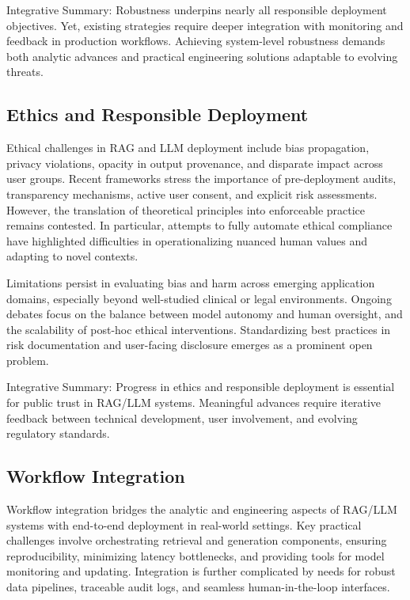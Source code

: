 \documentclass[sigconf]{acmart}
\begin{document}
Integrative Summary: Robustness underpins nearly all responsible deployment objectives. Yet, existing strategies require deeper integration with monitoring and feedback in production workflows. Achieving system-level robustness demands both analytic advances and practical engineering solutions adaptable to evolving threats.

\subsection{Ethics and Responsible Deployment}
Ethical challenges in RAG and LLM deployment include bias propagation, privacy violations, opacity in output provenance, and disparate impact across user groups. Recent frameworks stress the importance of pre-deployment audits, transparency mechanisms, active user consent, and explicit risk assessments. However, the translation of theoretical principles into enforceable practice remains contested. In particular, attempts to fully automate ethical compliance have highlighted difficulties in operationalizing nuanced human values and adapting to novel contexts.

Limitations persist in evaluating bias and harm across emerging application domains, especially beyond well-studied clinical or legal environments. Ongoing debates focus on the balance between model autonomy and human oversight, and the scalability of post-hoc ethical interventions. Standardizing best practices in risk documentation and user-facing disclosure emerges as a prominent open problem.

Integrative Summary: Progress in ethics and responsible deployment is essential for public trust in RAG/LLM systems. Meaningful advances require iterative feedback between technical development, user involvement, and evolving regulatory standards.

\subsection{Workflow Integration}
Workflow integration bridges the analytic and engineering aspects of RAG/LLM systems with end-to-end deployment in real-world settings. Key practical challenges involve orchestrating retrieval and generation components, ensuring reproducibility, minimizing latency bottlenecks, and providing tools for model monitoring and updating. Integration is further complicated by needs for robust data pipelines, traceable audit logs, and seamless human-in-the-loop interfaces.
\end{document}
